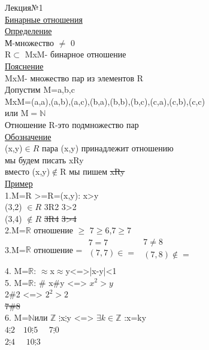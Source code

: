 \documentclass{article}
\begin{document}
Лекция№1\\
\underline{Бинарные отношения}\\
\underline{Определение}\\
М-множество $\neq$ 0\\
R$\subset$ MxM- бинарное отношение\\
\underline{Пояснение}\\
MxM- множество пар из элементов R\\
Допустим M={a,b,c}\\
MxM={(a,a),(a,b),(a,c),(b,a),(b,b),(b,c),(c,a),(c,b),(c,c)}\\
или M$=\mathbb N$\\
Отношение R-это подмножество пар\\
\underline{Обозначение}\\
(x,y)$\in R$ пара (x,y) принадлежит отношению\\
мы будем писать xRy\\
вместо (x,y)$\not \in$R мы пишем \sout {xRy}\\
\underline{Пример}\\
1.M=R >=R={(x,y): x>y}\\
(3,2) $\in R$ 3R2  3>2\\
(3,4) $\not \in R$ \sout{3R4} \sout{3>4}\\
2.M=$\mathbb R$ отношение $\geq$ \qquad $7\geq 6$,$7\geq 7$\\
3.M=$\mathbb R$ отношение =\qquad
$
\left.
\begin{array}{rcll}
7=7\qquad\\
(7,7)\in =\\
\end{array}
\right.
\left.
\begin{array}{rcll}
7\neq 8\qquad\\
(7,8)\not\in =\\
\end{array}
\right.
$ \\
4. M=$\mathbb R$: $\approx $\qquad x$\approx$y<=>|x-y|<1\\
5. M=$\mathbb R$: \# \qquad x\#y <=> $x^2>y$\\
2\#2 <=> $2^2>2$\\
\sout {7\#8}\\
6. M=$\mathbb N$или $\mathbb Z$ $ \vdots$\qquad x$\vdots$y <=> $\exists k\in \mathbb Z$ :x=ky\\
$4\vdots 2\quad 10\vdots 5\quad $ \sout{$7\vdots 0$}\\
\sout{$2\vdots4\quad$} \sout{$10\vdots3$}\\
\end{document}
